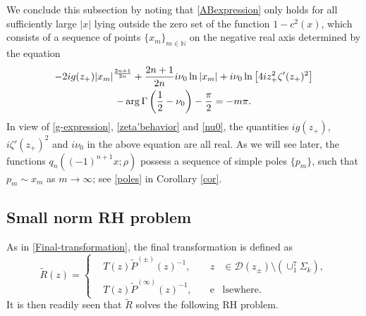 \documentclass[11pt,a4paper]{article}
\numberwithin{equation}{section}
\def\arg {\mathop{\rm arg}\nolimits}
\begin{document}
We conclude this subsection by noting  that \eqref{ABexpression} only holds for all sufficiently large $|x|$ lying outside the zero set of the function $1-c^2(x)$,
which consists of a sequence of points $\{x_m\}_{m\in \mathbb{N}}$ on the negative real axis determined by the equation
\begin{multline}\label{poles-equation}
-2ig(z_+)|x_m|^{\frac{2n+1}{2n}}
+\frac{2n+1}{2n}i\nu_0\ln|x_m|+i\nu_0\ln\left[4iz_+^2\zeta'(z_+)^2\right]
\\
-\arg\Gamma\left(\frac{1}{2}-\nu_0\right)-\frac{\pi}{2}=-m\pi.
\end{multline}
In view of \eqref{g-expression}, \eqref{zeta'behavior} and \eqref{nu0},
the  quantities $ig(z_+)$,  $i\zeta'(z_+)^2$ and $i\nu_0$ in the above equation are all real.
As we will see later, the functions $q_{n}((-1)^{n+1}x;\rho)$ possess a sequence of simple poles $\{p_m\}$, such that $p_m\sim x_m$ as $m\to\infty$; see \eqref{poles} in Corollary \ref{cor}.




\subsection{Small norm RH problem}
As in \eqref{Final-transformation}, the final transformation is defined as
\begin{equation}\label{Final-transformation-m}
\widetilde{R}(z)=\left\{\begin{aligned}
&{T}(z)\widetilde{P}^{(\pm)}(z)^{-1},\quad &z&\in \mathcal{D}(z_{\pm})\setminus(\cup_1^7\Sigma_k),\\
&{T}(z)\widetilde{P}^{(\infty)}(z)^{-1},\quad  &\mathrm{e}&\mathrm{lsewhere}. \end{aligned}
\right.
\end{equation}
It is then readily seen that $\widetilde{R}$ solves the following RH problem.
\end{document}
